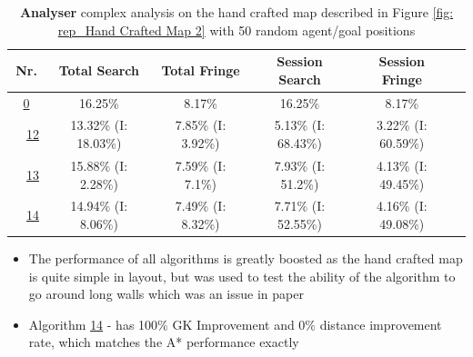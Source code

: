 \begin{table}[h!]
\bigskip

\begin{tabular}{|cc|c|c|c|c|c|}
\hline
\multicolumn{2}{|c|}{\textbf{Nr.}} & \textbf{Total Search} & \textbf{Total Fringe} & \textbf{Session Search} & \textbf{Session Fringe}\\
\hline
\hline
\multicolumn{2}{|c|}{\cellcolor{lightgray!20} \hyperref[tab: evalalgorithms]{0}} & 16.25\% & 8.17\% & 16.25\% & 8.17\%\\
\hline
\hline
\multicolumn{1}{|M{0.15cm}}{\cellcolor{cyan!40}} & \multicolumn{1}{M{0.15cm}|}{\cellcolor{blue!40} \hspace*{-0.5cm}\hyperref[tab: evalalgorithms]{12}} & 13.32\% (I: 18.03\%) & 7.85\% (I: 3.92\%) & 5.13\% (I: 68.43\%) & 3.22\% (I: 60.59\%)\\
\hline
\multicolumn{1}{|M{0.15cm}}{\cellcolor{cyan!40}} & \multicolumn{1}{M{0.15cm}|}{\cellcolor{red!40} \hspace*{-0.5cm}\hyperref[tab: evalalgorithms]{13}} & 15.88\% (I: 2.28\%) & 7.59\% (I: 7.1\%) & 7.93\% (I: 51.2\%) & 4.13\% (I: 49.45\%)\\
\hline
\multicolumn{1}{|M{0.15cm}}{\cellcolor{cyan!40}} & \multicolumn{1}{M{0.15cm}|}{\cellcolor{orange!40} \hspace*{-0.5cm}\hyperref[tab: evalalgorithms]{14}} & 14.94\% (I: 8.06\%) & 7.49\% (I: 8.32\%) & 7.71\% (I: 52.55\%) & 4.16\% (I: 49.08\%)\\
\hline
\end{tabular}


\caption{\textbf{Analyser} complex analysis on the hand crafted map described in Figure \ref{fig: rep_Hand Crafted Map 2} with 50 random agent/goal positions}
\label{tab: eval_complex_analysis_map_5} 
\end{table}

\begin{itemize}
    \item The performance of all algorithms is greatly boosted as the hand crafted map is quite simple in layout, but was used to test the ability of the algorithm to go around long walls which was an issue in paper \cite{nicola2018lstm}
    \item Algorithm \hyperref[tab: evalalgorithms]{14} - has 100\% GK Improvement and 0\% distance improvement rate, which matches the A* performance exactly
\end{itemize}

\pagebreak